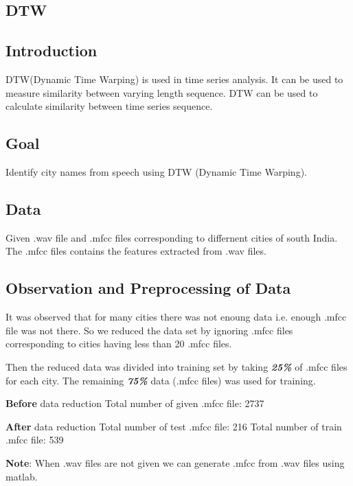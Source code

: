 \begin{center}
\section{DTW}
\end{center}

\subsection{Introduction}
\begin{flushleft}
  DTW(Dynamic Time Warping) is used in time series analysis. It can be used to measure similarity between varying length sequence.
  DTW can be used to calculate similarity between time series sequence.  
\end{flushleft}

\subsection{Goal}
\begin{flushleft}
    Identify city names from speech using DTW (Dynamic Time Warping).
\end{flushleft}

\subsection{Data}
\begin{flushleft}
  Given .wav file and .mfcc files corresponding to differnent cities of south India.
  The .mfcc files contains the features extracted from .wav files.
\end{flushleft}


\subsection{Observation and Preprocessing of Data}
\begin{flushleft}

  It was observed that for many cities there was not enoung data i.e. enough .mfcc file was not there.
  So we reduced the data set by ignoring .mfcc files corresponding to cities having less than 20 .mfcc files.\break
  
  Then the reduced data was divided into training set by taking \textbf{\textit{25\%}} of .mfcc files for each city.
  The remaining \textbf{\textit{75\%}} data (.mfcc files) was used for training.

  \break
  \textbf{Before} data reduction \break
  Total number of given .mfcc file: 2737 \break
  
 \textbf{After} data reduction \break
 Total number of test .mfcc file: 216 \break
 Total number of train .mfcc file: 539 \break

  \textbf{Note}: When .wav files are not given we can generate .mfcc from .wav files using matlab.
\end{flushleft}

